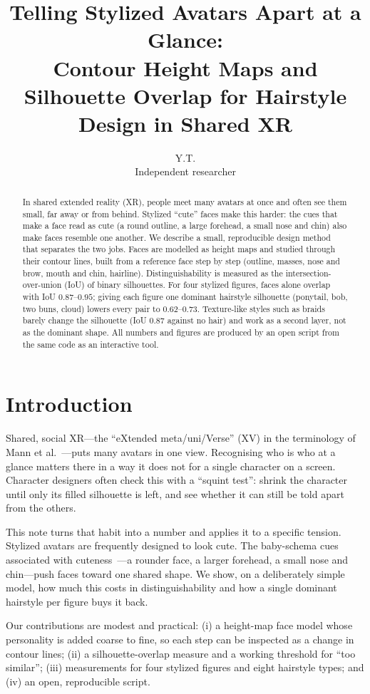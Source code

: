 \documentclass[11pt]{article}
\title{Telling Stylized Avatars Apart at a Glance:\\Contour Height Maps and Silhouette Overlap for Hairstyle Design in Shared XR}
\author{Y.T.\\\small Independent researcher}
\date{}
\begin{document}
\maketitle

\begin{abstract}
In shared extended reality (XR), people meet many avatars at once and often see them small, far away or from behind.
Stylized ``cute'' faces make this harder: the cues that make a face read as cute (a round outline, a large forehead, a small nose and chin) also make faces resemble one another.
We describe a small, reproducible design method that separates the two jobs.
Faces are modelled as height maps and studied through their contour lines, built from a reference face step by step (outline, masses, nose and brow, mouth and chin, hairline).
Distinguishability is measured as the intersection-over-union (IoU) of binary silhouettes.
For four stylized figures, faces alone overlap with IoU $0.87$--$0.95$; giving each figure one dominant hairstyle silhouette (ponytail, bob, two buns, cloud) lowers every pair to $0.62$--$0.73$.
Texture-like styles such as braids barely change the silhouette (IoU $0.87$ against no hair) and work as a second layer, not as the dominant shape.
All numbers and figures are produced by an open script from the same code as an interactive tool.
\end{abstract}

\section{Introduction}
Shared, social XR---the ``eXtended meta/uni/Verse'' (XV) in the terminology of Mann et al.~\cite{mann2022xv}---puts many avatars in one view.
Recognising who is who at a glance matters there in a way it does not for a single character on a screen.
Character designers often check this with a ``squint test'': shrink the character until only its filled silhouette is left, and see whether it can still be told apart from the others.

This note turns that habit into a number and applies it to a specific tension.
Stylized avatars are frequently designed to look cute.
The baby-schema cues associated with cuteness~\cite{lorenz1943,glocker2009}---a rounder face, a larger forehead, a small nose and chin---push faces toward one shared shape.
We show, on a deliberately simple model, how much this costs in distinguishability and how a single dominant hairstyle per figure buys it back.

Our contributions are modest and practical:
(i) a height-map face model whose personality is added coarse to fine, so each step can be inspected as a change in contour lines;
(ii) a silhouette-overlap measure and a working threshold for ``too similar'';
(iii) measurements for four stylized figures and eight hairstyle types; and
(iv) an open, reproducible script.
\end{document}

